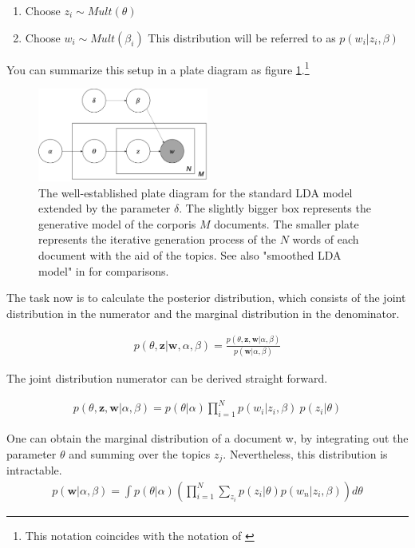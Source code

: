 \documentclass[11pt,a4paper]{article}
\begin{document}
\begin{enumerate}
	\item Choose $z_i \sim Mult(\theta)$
	
	\item Choose $w_i \sim Mult(\beta_i)$ This distribution will be referred to as $p(w_i|z_i,\beta)$
\end{enumerate}
You can summarize this setup in a plate diagram as figure \ref{PlateDiagram}.\footnote{This notation coincides with the notation of \cite{Hornik2011}}


\begin{figure}[h]
	\label{PlateDiagram}
	\centering
	\includegraphics[width=0.5\textwidth]{LDA_Plate_Diagram.png}
	\caption{The well-established plate diagram for the standard LDA model extended by the parameter $\delta$. The slightly bigger box represents the generative model of the corporis $M$ documents. The smaller plate represents the iterative generation process of the $N$ words of each document with the aid of the topics. See also "smoothed LDA model" in \cite{Blei2003}  for comparisons.}
\end{figure}

The task now is to calculate the posterior distribution, which consists of the joint distribution in the numerator and the marginal distribution in the denominator.

\begin{align}\label{posterior}
	p(\theta,\textbf{z}|\textbf{w},\alpha,\beta)= \frac{p(\theta,\textbf{z},\textbf{w}|\alpha,\beta)}
	{p(\textbf{w}|\alpha, \beta)}
\end{align}

The joint distribution numerator can be derived straight forward.

\begin{align}\label{joint}
	p(\theta,\textbf{z},\textbf{w}|\alpha,\beta)=p(\theta|\alpha)\prod_{i=1}^{N}p(w_i|z_i,\beta)\ p(z_i|\theta)
\end{align}

One can obtain the marginal distribution of a document w, by integrating out the parameter $\theta$ and summing over the topics $z_j$. Nevertheless, this distribution is intractable.
\begin{align}\label{marginal}
p(\textbf{w}|\alpha, \beta)=\int p(\theta|\alpha) \left( \prod_{i=1}^{N} \sum_{z_i}p(z_i|\theta)p(w_n|z_i,\beta) \right) d\theta
\end{align}



	
  
  

	
	
\end{document}
